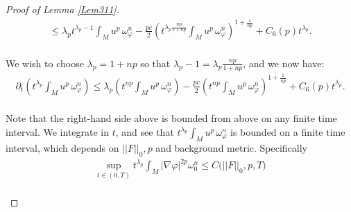 \documentclass[11pt]{amsart}
\numberwithin{equation}{section}
\begin{document}
\begin{proof}[Proof of Lemma \ref{Lem311}]
\begin{align}
	\le  \lambda_p t^{\lambda_p - 1} \int_M u^p \, \omega_{\varphi}^n - \frac{pc}{2} \left( t^{\lambda_p \frac{np}{1 + np}} \int_M u^p \, \omega_{\varphi}^n \right)^{1 + \frac{1}{np}}  + C_{6}(p) t^{\lambda_p}.
\end{align}\\
We wish to choose \( \lambda_p = 1 + np \) so that \( \lambda_p - 1 = \lambda_p \frac{np}{1 + np} \), and we now have:
\begin{align}
	\partial_t \left( t^{\lambda_p} \int_M u^p \, \omega_{\varphi}^n \right) \le  \lambda_p \left( t^{np} \int_M u^p \, \omega_{\varphi}^n \right) - \frac{pc}{2} \left( t^{np} \int_M u^p \, \omega_{\varphi}^n \right)^{1 + \frac{1}{np}} + C_{6}(p) t^{\lambda_p}.
\end{align}\\
Note that the right-hand side above is bounded from above on any finite time interval. We integrate in \( t \), and see that \( t^{\lambda_p} \int_M u^p \, \omega_{\varphi}^n \) is bounded on a finite time interval, which depends on $||F||_0, p$ and background metric. Specifically 
\begin{align}
	\sup_{t\in (0,T)} t^{\lambda_p} \int_M |\nabla\varphi|^{2p}\omega_0^n \le  C\big(||F||_0,p,T\big) 
\end{align} \\
\end{proof}
\end{document}
